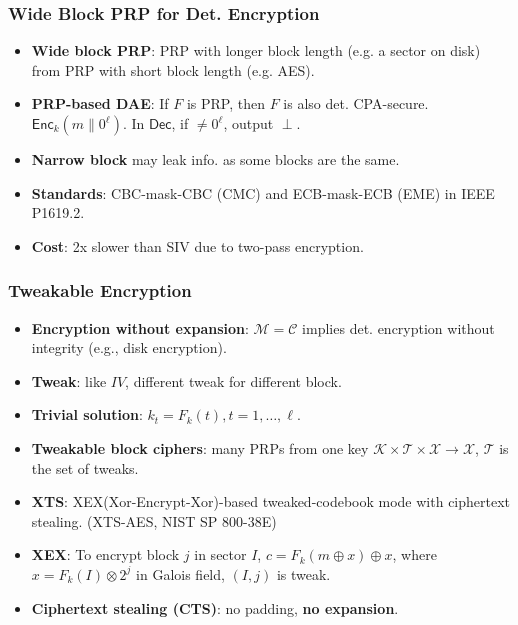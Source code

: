 \begin{frame}\frametitle{Wide Block PRP for Det. Encryption}
\begin{itemize}
\item \textbf{Wide block PRP}: PRP with longer block length (e.g. a sector on disk) from PRP with short block length (e.g. AES).
\item \textbf{PRP-based DAE}: If $F$ is PRP, then $F$ is also det. CPA-secure. $\mathsf{Enc}_k(m\| 0^{\ell})$. In $\mathsf{Dec}$, if $\neq 0^{\ell}$, output $\perp$.
\item \textbf{Narrow block} may leak info. as some blocks are the same.
\item \textbf{Standards}: CBC-mask-CBC (CMC) and ECB-mask-ECB (EME) in IEEE P1619.2.
\item \textbf{Cost}: 2x slower than SIV due to two-pass encryption.
\end{itemize}
\end{frame}
\begin{frame}\frametitle{Tweakable Encryption}
\begin{itemize}
\item \textbf{Encryption without expansion}: $\mathcal{M} = \mathcal{C}$ implies det. encryption without integrity (e.g., disk encryption).
\item \textbf{Tweak}: like $IV$, different tweak for different block.
\item \textbf{Trivial solution}: $k_t = F_k(t), t=1,\dots,\ell.$
\item \textbf{Tweakable block ciphers}: many PRPs from one key $\mathcal{K} \times \mathcal{T} \times \mathcal{X} \to \mathcal{X}$, $\mathcal{T}$ is the set of tweaks.
\item \textbf{XTS}: XEX(Xor-Encrypt-Xor)-based tweaked-codebook mode with ciphertext stealing. (XTS-AES, NIST SP 800-38E)
\item \textbf{XEX}: To encrypt block $j$ in sector $I$, $c = F_k(m\oplus x)\oplus x$, where $x=F_k(I)\otimes 2^j$ in Galois field, $(I,j)$ is tweak.
\item \textbf{Ciphertext stealing (CTS)}: no padding, \textbf{no expansion}.
\begin{figure}
\begin{center}

\end{center}
\end{figure}
\end{itemize}
\end{frame}
